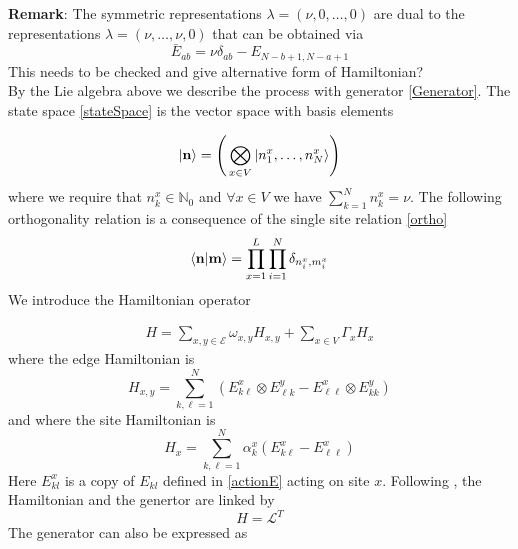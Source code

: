 \documentclass[11pt]{article}
\numberwithin{equation}{section}
\numberwithin{equation}{subsection}
\newcommand{\twoj}{\nu}
\begin{document}
\noindent
\textbf{Remark}: The symmetric representations $\lambda=(\twoj,0,\ldots,0)$ are dual to the representations $\lambda=(\twoj,\ldots,\twoj,0)$ that can be obtained via 
\begin{equation}
   \bar E_{ab}=\nu\delta_{ab}-E_{N-b+1,N-a+1}
\end{equation}
{\color{red} This needs to be checked and give alternative form of Hamiltonian?}\\
By the Lie algebra above we describe the process with generator \eqref{Generator}. The state space \eqref{stateSpace} is the vector space with basis elements 

\begin{equation}
|{\bf n}\rangle=\left(\,\bigotimes_{x\in V}	|n_{1}^{x},\ldots,n_{N}^{x}\rangle\right)
\end{equation}
where we require that $n_{k}^{x}\in \mathbb{N}_{0}$ and $\forall x\in V$ we have $\sum_{k=1}^{N}n_{k}^{x}=\nu$. The following orthogonality relation is a consequence of the single site relation \eqref{ortho}
\begin{equation}
    \langle {\bf n}|{\bf m}\rangle =\prod_{x=1}^L\prod_{i=1}^N\delta_{n^x_i,m^{x}_i}
\end{equation}
We introduce the Hamiltonian operator

\begin{equation}\label{OriginalHamiltonian}
	\begin{split}
		H=\sum_{x,y\in \mathcal{E}}\omega_{x,y}H_{x,y}+\sum_{x\in V}\Gamma_{x}H_{x}
	\end{split}
\end{equation}
where the edge Hamiltonian is
\begin{equation}\label{edgeHamiltonian}
H_{x,y}=\sum_{k,\ell=1}^{N}\left(E_{k\ell}^{x}\otimes E_{\ell k}^{y}-E_{\ell\ell}^{x}\otimes E_{kk}^{y}\right)
 \end{equation}
 and where the site Hamiltonian is
 \begin{equation}\label{siteHamiltonian}
H_{x}=\sum_{k,\ell=1}^{N}\alpha_{k}^{x}\left(E_{k\ell}^{x}-E_{\ell\ell}^{x}\right)
\end{equation}
Here $E_{kl}^{x}$ is a copy of $E_{kl}$ defined in \eqref{actionE} acting on site $x$. 
Following  \cite{belitsky2015self}, the Hamiltonian and the genertor are linked by
\begin{equation}
H=\mathcal{L}^{T}
\end{equation}
The generator can also be expressed as 
\end{document}
